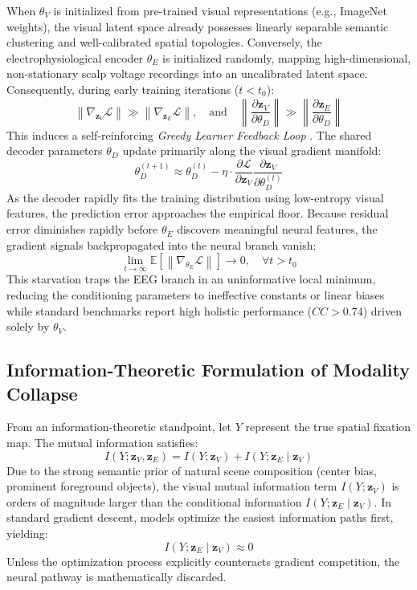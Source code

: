 \documentclass[journal,twocolumn]{IEEEtran}
\begin{document}
When $\theta_V$ is initialized from pre-trained visual representations (e.g., ImageNet weights), the visual latent space already possesses linearly separable semantic clustering and well-calibrated spatial topologies. Conversely, the electrophysiological encoder $\theta_E$ is initialized randomly, mapping high-dimensional, non-stationary scalp voltage recordings into an uncalibrated latent space. Consequently, during early training iterations ($t < t_0$):
\begin{equation}
\left\| \nabla_{\mathbf{z}_V} \mathcal{L} \right\| \gg \left\| \nabla_{\mathbf{z}_E} \mathcal{L} \right\|, \quad \text{and} \quad \left\| \frac{\partial \mathbf{z}_V}{\partial \theta_D} \right\| \gg \left\| \frac{\partial \mathbf{z}_E}{\partial \theta_D} \right\|
\end{equation}
This induces a self-reinforcing \textit{Greedy Learner Feedback Loop} \cite{wang2020makes}. The shared decoder parameters $\theta_D$ update primarily along the visual gradient manifold:
\begin{equation}
\theta_D^{(t+1)} \approx \theta_D^{(t)} - \eta \cdot \frac{\partial \mathcal{L}}{\partial \mathbf{z}_V} \frac{\partial \mathbf{z}_V}{\partial \theta_D^{(t)}}
\end{equation}
As the decoder rapidly fits the training distribution using low-entropy visual features, the prediction error approaches the empirical floor. Because residual error diminishes rapidly before $\theta_E$ discovers meaningful neural features, the gradient signals backpropagated into the neural branch vanish:
\begin{equation}
\lim_{t \to \infty} \mathbb{E}\left[ \left\| \nabla_{\theta_E} \mathcal{L} \right\| \right] \to 0, \quad \forall t > t_0
\end{equation}
This starvation traps the EEG branch in an uninformative local minimum, reducing the conditioning parameters to ineffective constants or linear biases while standard benchmarks report high holistic performance ($CC > 0.74$) driven solely by $\theta_V$.

\subsection{Information-Theoretic Formulation of Modality Collapse}
From an information-theoretic standpoint, let $Y$ represent the true spatial fixation map. The mutual information satisfies:
\begin{equation}
I(Y; \mathbf{z}_V, \mathbf{z}_E) = I(Y; \mathbf{z}_V) + I(Y; \mathbf{z}_E \mid \mathbf{z}_V)
\end{equation}
Due to the strong semantic prior of natural scene composition (center bias, prominent foreground objects), the visual mutual information term $I(Y; \mathbf{z}_V)$ is orders of magnitude larger than the conditional information $I(Y; \mathbf{z}_E \mid \mathbf{z}_V)$. In standard gradient descent, models optimize the easiest information paths first, yielding:
\begin{equation}
I(Y; \mathbf{z}_E \mid \mathbf{z}_V) \approx 0
\end{equation}
Unless the optimization process explicitly counteracts gradient competition, the neural pathway is mathematically discarded.
\end{document}
